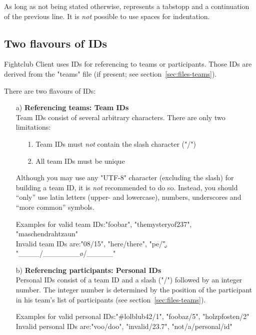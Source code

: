 \documentclass[11pt]{ltxdoc}
\def\highlight#1{%
    \colorbox{red!15}{#1}%
    \index{\textsf{#1}}}
\begin{document}
    \medskip
    As long as not being stated otherwise, \highlight{\mapsto} represents a tabstopp and \highlight{\hookrightarrow} a continuation of the previous line. It is \textit{not} possible to use spaces for indentation.
    
    
    
    \subsection{Two flavours of IDs}\label{sec:notes-id}
    Fightclub Client uses IDs for referencing to teams or participants. Those IDs are derived from the "teams" file (if present; see section~\ref{sec:files-teams}).
    
    \medskip
    There are two flavours of IDs:
    \begin{itemize}
        \item[a)] \textbf{Referencing teams: \highlight{Team IDs}} \\
            Team IDs consist of several arbitrary characters. There are only two limitations:
            \begin{itemize}
                \item[1.] Team IDs must \textit{not} contain the slash character ("/")
                \item[2.] All team IDs must be unique
            \end{itemize}
            
            Although you may use any "UTF-8" character (excluding the slash) for building a team ID, it is \textit{not} recommended to do so.
            Instead, you should \enquote{only} use latin letters (upper- and lowercase), numbers, underscores and \enquote{more common} symbols.
            
            \smallskip
            Examples for valid team IDs:\quad "foobar", "themysteryof237", "maschendrahtzaun" \\
            Invalid team IDs are:\quad "08/15", "here/there", "pe/\k", "____/\_______\o/_____"

        
        \item[b)] \textbf{Referencing participants: \highlight{Personal IDs}} \\
            Personal IDs consist of a team ID and a slash ("/") followed by an integer number. The integer number is determined by the position of the participant in his team's list of participants (see section~\ref{sec:files-teams}).
            
            \smallskip
            Examples for valid personal IDs:\quad "#lolblub42/1", "foobaz/5", "holzpfosten/2" \\
            Invalid personal IDs are:\quad "voo/doo", "invalid/23.7", "not/a/personal/id"
    \end{itemize}
\end{document}
